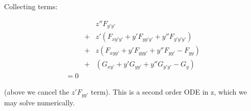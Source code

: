 \documentclass[pdflatex,sn-mathphys-num]{sn-jnl}%
\theoremstyle{thmstyleone}%
\theoremstyle{thmstyletwo}%
\theoremstyle{thmstylethree}%
\begin{document}
Collecting terms:

\begin{eqnarray}
&{}&  z''F_{y'y'}\\
&+& z'(F_{xy'y'} + y'F_{yy'y'} + y''F_{y'y'y'})\\
&+& z (F_{xyy'} + y'F_{yyy'} + y''F_{yy'}-F_{yy})\\
&+& (G_{xy'} + y'G_{yy'} + y''G_{y'y'}- G_{y})\\
= 0
\end{eqnarray}

(above we cancel the $z'F_{yy'}$ term). This is a second order ODE in
z, which we may solve numerically.

\end{document}
